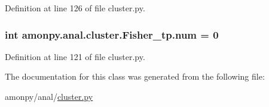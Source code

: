 Definition at line 126 of file cluster.\-py.

\hypertarget{classamonpy_1_1anal_1_1cluster_1_1_fisher__tp_a3eff8425c58f4b61a8bff758141bfc3e}{
\subsubsection[{num}]{\setlength{\rightskip}{0pt plus 5cm}int amonpy.\-anal.\-cluster.\-Fisher\-\_\-tp.\-num = 0\hspace{0.3cm}{\ttfamily [static]}}}\label{classamonpy_1_1anal_1_1cluster_1_1_fisher__tp_a3eff8425c58f4b61a8bff758141bfc3e}


Definition at line 121 of file cluster.\-py.



The documentation for this class was generated from the following file\-:\begin{DoxyCompactItemize}
\item 
amonpy/anal/\hyperlink{cluster_8py}{cluster.\-py}\end{DoxyCompactItemize}
